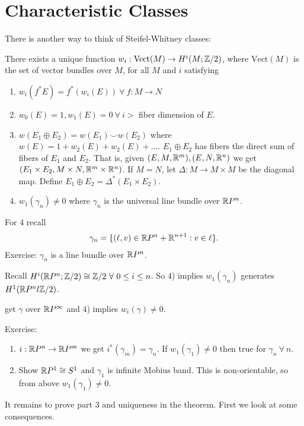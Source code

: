 \documentclass[12pt,class=article,crop=false]{standalone}
\begin{document}
\section{Characteristic Classes}
There is another way to think of Steifel-Whitney classes:
\begin{thm}
There exists a unique function $ w_i: \text{Vect}(M) \to H^{i}(M;\mathbb{Z} /2 )$, where $ \text{Vect}(M) $ is the set of vector bundles over $ M$, for all  $ M$ and $ i$ satisfying
 \begin{enumerate}[label=(\arabic*)]
	\item $ w_i(f^* E) = f^* (w_i(E)) \ \forall \ f: M \to N$
	\item $ w_0(E) =1, w_1(E) = 0 \ \forall \ i > $ fiber dimension of $ E$.
	\item  $ w(E_1 \oplus E_2) = w(E_1) \smile w(E_2)$ where $ w(E)=1+w_2(E)+w_2(E)+ \ldots$. $ E_1 \oplus E_2$ has fibers the direct sum of fibers of $ E_1$ and $ E_2$. That is, given $(E,M,\mathbb{R}^{m}),(E,N,\mathbb{R}^{n})$ we get $ (E_1 \times E_2,M \times N, \mathbb{R}^{m} \times \mathbb{R}^{n})$. If $ M=N$, let $ \Delta: M \to M \times M$ be the diagonal map. Define $ E_1 \oplus E_2 = \Delta^* (E_1 \times E_2)$.
	\item $ w_1( \gamma_n) \neq 0$ where $ \gamma_n$ is the universal line bundle over $ \mathbb{R} P^{n}$.
\end{enumerate}
\end{thm}
For 4 recall
\begin{align*}
	\gamma_n=\{(\ell,v) \in \mathbb{R} P^{n}+ \mathbb{R}^{n+1}: v \in\ell\} .
\end{align*}
Exercise: $ \gamma_n$ is a line bundle over $ \mathbb{R} P^{n}$.

Recall $ H^{i}(\mathbb{R} P^{n}; \mathbb{Z} /2) \cong \mathbb{Z} /2 \ \forall \ 0 \leq i \leq n$. So 4) implies  $ w_1( \gamma_n)$ generates $ H^{1}(\mathbb{R} P^{n}l \mathbb{Z} /2)$.

get $ \gamma$ over $ \mathbb{R} P^{\infty}$ and 4) implies $ w_i( \gamma) \neq 0$.

Exercise:
\begin{enumerate}[label=(\arabic*)]
	\item $ i: \mathbb{R} P^{n} \to \mathbb{R} P^{m}$ we get $ i^* ( \gamma_m) = \gamma_n$. If $ w_1( \gamma_1) \neq 0$ then true for $ \gamma_n \ \forall \ n$.
	\item Show $ \mathbb{R} P^{1} \cong S^{1}$ and $ \gamma_1$ is infinite Mobius band. This is non-orientable, so from above $ w_1( \gamma_1) \neq 0$.
\end{enumerate}
It remains to prove part 3 and uniqueness in the theorem. First we look at some consequences.
\end{document}
